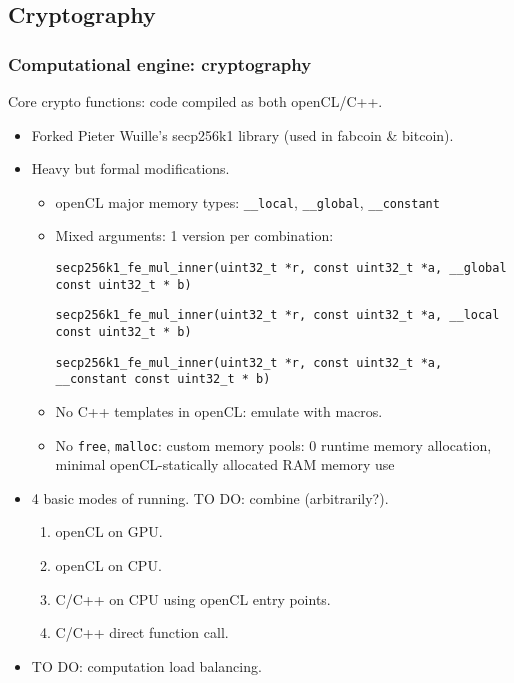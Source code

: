 \subsection{Cryptography}
\begin{frame}[fragile]
\frametitle{Computational engine: cryptography}
Core crypto functions: code compiled as both openCL/C++.
\begin{itemize}
\item<2-> Forked Pieter Wuille's secp256k1 library (used in fabcoin \& bitcoin).
\item<3-> Heavy but formal modifications.
\begin{itemize}
\item<4-> openCL major memory types: \verb|__local|, \verb|__global|, \verb|__constant|
\item<5-> Mixed arguments: 1 version per combination:
\medskip


{
\tiny
\verb|secp256k1_fe_mul_inner(uint32_t *r, const uint32_t *a, __global const uint32_t * b) |

\verb|secp256k1_fe_mul_inner(uint32_t *r, const uint32_t *a, __local const uint32_t * b) |

\verb|secp256k1_fe_mul_inner(uint32_t *r, const uint32_t *a, __constant const uint32_t * b) |
}

\medskip
\item<6-> No C++ templates in openCL: emulate with macros.
\item<7-> No \verb|free|, \verb|malloc|: custom memory pools: 0 runtime memory allocation, minimal openCL-statically allocated RAM memory use
\end{itemize}
\item<8-> 4 basic modes of running. TO DO: combine (arbitrarily?).
\begin{enumerate}
\item openCL on GPU.
\item openCL on CPU.
\item C/C++ on CPU using openCL entry points.
\item C/C++ direct function call.
\end{enumerate}
\item<9-> TO DO: computation load balancing.

\end{itemize}
\end{frame}

